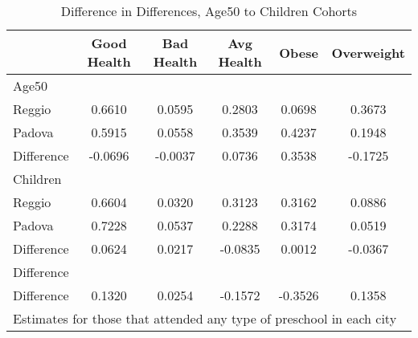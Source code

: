 \begin{table}[htbp]\centering
\caption{Difference in Differences, Age50 to Children Cohorts}
\begin{tabular}{l*{5}{c}}
\hline\hline
            & Good Health&  Bad Health&  Avg Health&       Obese&  Overweight\\
\hline
Age50       &            &            &            &            &            \\
Reggio      &      0.6610&      0.0595&      0.2803&      0.0698&      0.3673\\
Padova      &      0.5915&      0.0558&      0.3539&      0.4237&      0.1948\\
Difference  &     -0.0696&     -0.0037&      0.0736&      0.3538&     -0.1725\\
\hline
Children    &            &            &            &            &            \\
Reggio      &      0.6604&      0.0320&      0.3123&      0.3162&      0.0886\\
Padova      &      0.7228&      0.0537&      0.2288&      0.3174&      0.0519\\
Difference  &      0.0624&      0.0217&     -0.0835&      0.0012&     -0.0367\\
\hline
Difference  &            &            &            &            &            \\
Difference  &      0.1320&      0.0254&     -0.1572&     -0.3526&      0.1358\\
\hline\hline
\multicolumn{6}{l}{\footnotesize Estimates for those that attended any type of preschool in each city}\\
\end{tabular}
\end{table}
